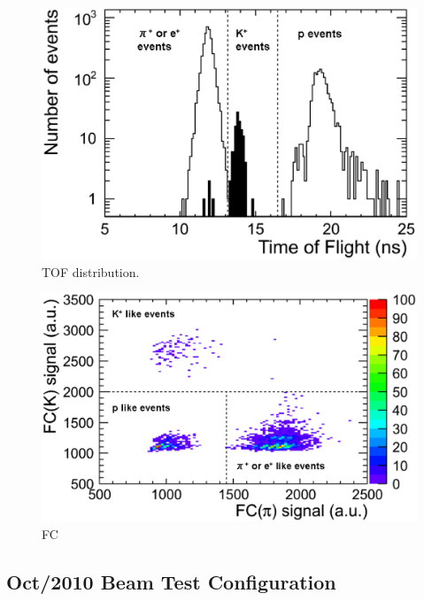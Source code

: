 \begin{figure}[htbp]
  \begin{center}
    \includegraphics[width=1.0\hsize,clip]{fig/TOF_cut.eps}
  \end{center}
 \caption{TOF distribution.}
 \label{fig:BeamCountersTOF}
\end{figure}

\begin{figure}[htbp]
  \begin{center}
    \includegraphics[width=1.0\hsize,clip]{fig/FC_KPI.eps}
  \end{center}
 \caption{FC}
 \label{fig:BeamCountersFC}
\end{figure}


\subsection{Oct/2010 Beam Test Configuration}

